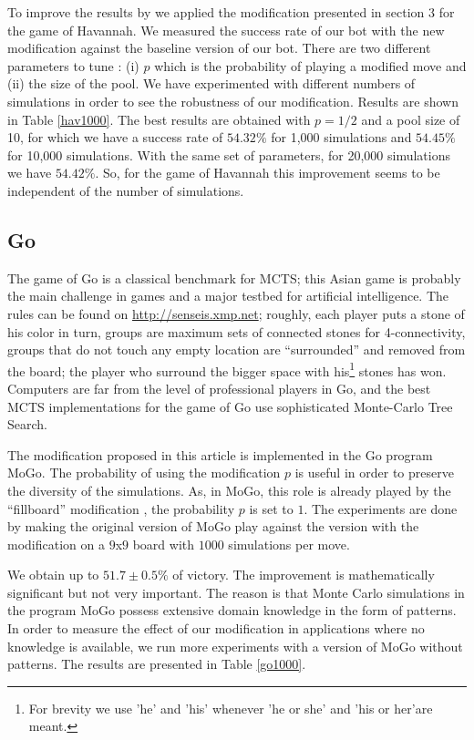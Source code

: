 \documentclass{llncs}
\begin{document}
To improve the results by \cite{fabienHavannah} we applied the modification presented in section 3 for the game of Havannah. We measured the success rate of our bot with the new modification against the baseline version of our bot. There are two different parameters to tune : (i) $p$ which is the probability of playing a modified move and (ii) the size of the pool.
We have experimented with different numbers of simulations in order to see the robustness of our modification.
Results are shown in Table \ref{hav1000}. The best results are obtained with $p=1/2$ and a pool size of 10, for which we have a success rate of $54.32\%$ for 1,000 simulations and $54.45\%$ for 10,000 simulations. With the same set of parameters, for 20,000 simulations we have $54.42\%$. So, for the game of Havannah this improvement seems to be independent of the number of simulations.



\subsection{Go}\label{go}

 The game of Go is a classical benchmark for MCTS; this Asian game is probably the main challenge in games and a major testbed for artificial intelligence. The rules can be found on \url{http://senseis.xmp.net}; roughly, each player puts a stone of his color in turn, groups are maximum sets of connected stones for 4-connectivity, groups that do not touch any empty location are ``surrounded'' and removed from the board; the player who surround the bigger space with his\footnote{For brevity we use 'he' and 'his' whenever 'he or she' and 'his or her'are meant.} stones has won. Computers are far from the level of professional players in Go, and the best MCTS implementations for the game of Go use sophisticated Monte-Carlo Tree Search.

The modification proposed in this article is implemented in the Go program MoGo. The probability of using the modification $p$ is useful in order to preserve the diversity of the simulations. As, in MoGo, this role is already played by the ``fillboard'' modification \cite{peacg}, the probability $p$ is set to $1$. 
The experiments are done by making the original version of MoGo play against the version with the modification on a $9$x$9$ board with $1000$ simulations per move.

We obtain up to $51.7\pm0.5\%$ of victory. The improvement is mathematically significant but not very important. The reason is that Monte Carlo simulations in the program MoGo possess extensive domain knowledge in the form of patterns. In order to measure the effect of our modification in applications where no knowledge is available, we run more experiments with a version of MoGo without patterns. The results are presented in Table \ref{go1000}.
\end{document}
